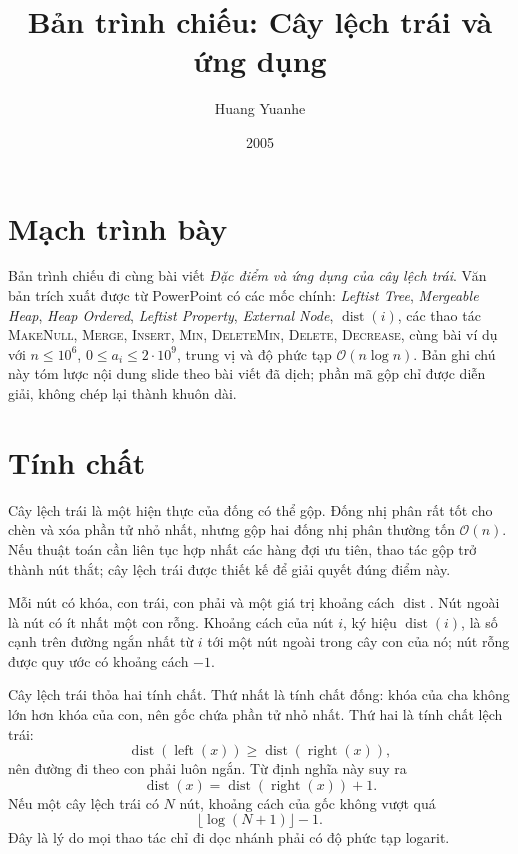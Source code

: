\documentclass[11pt]{article}
\title{Bản trình chiếu: Cây lệch trái và ứng dụng}
\author{Huang Yuanhe}
\date{2005}
\newcommand{\Oh}{\mathcal{O}}
\begin{document}
\maketitle


\section{Mạch trình bày}

Bản trình chiếu đi cùng bài viết \emph{Đặc điểm và ứng dụng của cây lệch
trái}. Văn bản trích xuất được từ PowerPoint có các mốc chính:
\textit{Leftist Tree}, \textit{Mergeable Heap}, \textit{Heap Ordered},
\textit{Leftist Property}, \textit{External Node}, \(\operatorname{dist}(i)\),
các thao tác \textsc{MakeNull}, \textsc{Merge}, \textsc{Insert},
\textsc{Min}, \textsc{DeleteMin}, \textsc{Delete}, \textsc{Decrease}, cùng
bài ví dụ với \(n\le 10^6\), \(0\le a_i\le 2\cdot 10^9\), trung vị và độ
phức tạp \(\Oh(n\log n)\). Bản ghi chú này tóm lược nội dung slide theo bài
viết đã dịch; phần mã gộp chỉ được diễn giải, không chép lại thành khuôn dài.

\section{Tính chất}

Cây lệch trái là một hiện thực của đống có thể gộp. Đống nhị phân rất tốt cho
chèn và xóa phần tử nhỏ nhất, nhưng gộp hai đống nhị phân thường tốn
\(\Oh(n)\). Nếu thuật toán cần liên tục hợp nhất các hàng đợi ưu tiên, thao
tác gộp trở thành nút thắt; cây lệch trái được thiết kế để giải quyết đúng
điểm này.

Mỗi nút có khóa, con trái, con phải và một giá trị khoảng cách
\(\operatorname{dist}\). Nút ngoài là nút có ít nhất một con rỗng. Khoảng cách
của nút \(i\), ký hiệu \(\operatorname{dist}(i)\), là số cạnh trên đường ngắn
nhất từ \(i\) tới một nút ngoài trong cây con của nó; nút rỗng được quy ước có
khoảng cách \(-1\).

Cây lệch trái thỏa hai tính chất. Thứ nhất là tính chất đống:
khóa của cha không lớn hơn khóa của con, nên gốc chứa phần tử nhỏ nhất. Thứ
hai là tính chất lệch trái:
\[
  \operatorname{dist}(\operatorname{left}(x)) \ge
  \operatorname{dist}(\operatorname{right}(x)),
\]
nên đường đi theo con phải luôn ngắn. Từ định nghĩa này suy ra
\[
  \operatorname{dist}(x)=\operatorname{dist}(\operatorname{right}(x))+1.
\]
Nếu một cây lệch trái có \(N\) nút, khoảng cách của gốc không vượt quá
\[
  \lfloor\log(N+1)\rfloor-1.
\]
Đây là lý do mọi thao tác chỉ đi dọc nhánh phải có độ phức tạp logarit.
\end{document}
